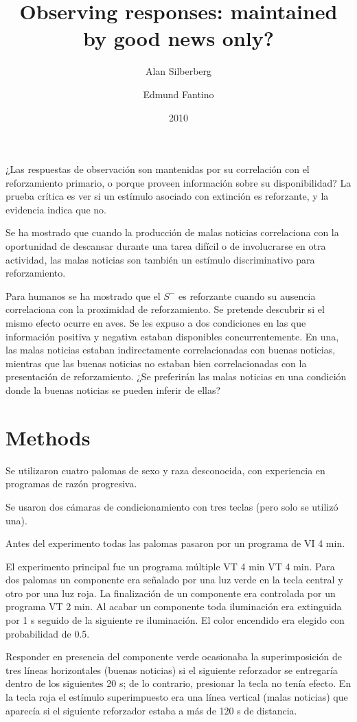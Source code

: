 \documentclass[a4paper,12pt]{article}
\title{Observing responses: maintained by good news only?}
\author{Alan Silberberg \and Edmund Fantino}
\date{2010}
\begin{document}
{\scshape\bfseries \maketitle}

¿Las respuestas de observación son mantenidas por su correlación con el reforzamiento primario, o porque proveen información sobre su disponibilidad?
La prueba crítica es ver si un estímulo asociado con extinción es reforzante, y la evidencia indica que no.

Se ha mostrado que cuando la producción de malas noticias correlaciona con la oportunidad de descansar durante una tarea difícil o de involucrarse en otra actividad, las malas noticias son también un estímulo discriminativo para reforzamiento.

Para humanos se ha mostrado que el $S^{-}$ es reforzante cuando su ausencia correlaciona con la proximidad de reforzamiento.
Se pretende descubrir si el mismo efecto ocurre en aves.
Se les expuso a dos condiciones en las que información positiva y negativa estaban disponibles concurrentemente.
En una, las malas noticias estaban indirectamente correlacionadas con buenas noticias, mientras que las buenas noticias no estaban bien correlacionadas con la presentación de reforzamiento.
¿Se preferirán las malas noticias en una condición donde la buenas noticias se pueden inferir de ellas?

\section{Methods}

Se utilizaron cuatro palomas de sexo y raza desconocida, con experiencia en programas de razón progresiva.

Se usaron dos cámaras de condicionamiento con tres teclas (pero solo se utilizó una).

Antes del experimento todas las palomas pasaron por un programa de VI 4 min.

El experimento principal fue un programa múltiple VT 4 min VT 4 min.
Para dos palomas un componente era señalado por una luz verde en la tecla central y otro por una luz roja. La finalización de un componente era controlada por un programa VT 2 min.
Al acabar un componente toda iluminación era extinguida por 1 s seguido de la siguiente re iluminación.
El color encendido era elegido con probabilidad de 0.5.

Responder en presencia del componente verde ocasionaba la superimposición de tres líneas horizontales (buenas noticias) si el siguiente reforzador se entregaría dentro de los siguientes 20 s; de lo contrario, presionar la tecla no tenía efecto.
En la tecla roja el estímulo superimpuesto era una línea vertical (malas noticias) que aparecía si el siguiente reforzador estaba a más de 120 s de distancia.
\end{document}
